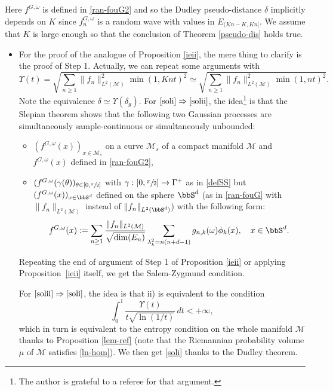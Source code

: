 Here $f^{G,\omega}$ is defined in \eqref{ran-fouG2} and so the Dudley pseudo-distance $\delta$ implicitly depends on $K$ since $f_n^{G,\omega}$ is a random wave with values in $E_{(Kn-K,Kn]}$.
We assume that $K$ is large enough so that the conclusion of Theorem \ref{pseudo-dis} holds true.

\begin{itemize}
\item
For the proof of the analogue of Proposition \ref{ieii}, the mere thing to clarify is the proof of Step 1. Actually, we can repeat some arguments with
\begin{equation*}
\Upsilon(t)=\sqrt{\sum_{n\geq 1} \|f_n\|_{L^2(\mathcal{M})}^2 \min(1,Knt)^2} \simeq \sqrt{\sum_{n\geq 1} \|f_n\|_{L^2(\mathcal{M})}^2 \min(1,nt)^2}.
\end{equation*}
Note the equivalence $\delta\simeq \Upsilon(\delta_g)$.
For $\eqref{soli}\Rightarrow\eqref{solii}$, the idea\footnote{The author is grateful to a referee for that argument.} is that the Slepian theorem shows that the following two Gaussian processes are simultaneously sample-continuous or simultaneously unbounded:
\begin{itemize}
\item $(f^{G,\omega}(x))_{x\in \mathcal{M}_s}$ on a curve $\mathcal{M}_s$ of a compact manifold $ \mathcal{M}$ and $f^{G,\omega}(x)$ defined in \eqref{ran-fouG2},
\item $(f^{G,\omega}(\gamma(\theta))_{\theta\in [0,\sfrac{\pi}{2}]}$ with $\gamma:[0,\sfrac{\pi}{2}]\to \Gamma^+$ as in \eqref{defSS} but $(f^{G,\omega}(x))_{x\in \bbS^d}$ defined on the sphere $\bbS^d$ (as in \eqref{ran-fouG} with $\|f_n\|_{L^2(\mathcal{M})}$ instead of $\|f_n\|_{L^2(\bbS^d)}$) with the following form:
\begin{equation*}
f^{G,\omega}(x):=\sum_{n\geq 1} \frac{\|f_n\|_{L^2(\mathcal{M})}}{\sqrt{\dim(E_n)}}\sum_{\lambda_k^2=n(n+d-1)} g_{n,k}(\omega) \phi_k(x),\quad x\in \bbS^d.
\end{equation*}
\end{itemize}
Repeating the end of argument of Step 1 of Proposition \ref{ieii} or applying Proposition~\ref{ieii} itself, we get the Salem-Zygmund condition.

For $\eqref{solii}\Rightarrow\eqref{soli}$, the idea is that ii) is equivalent to the condition
\[
\int_{0}^{1} \frac{\Upsilon(t)}{t\sqrt{\ln(1/t)}}\,dt<+\infty,
\]
which in turn is equivalent to the entropy condition on the whole manifold $\mathcal{M}$ thanks to Proposition \ref{lem-ref} (note that the Riemannian probability volume $\mu$ of $\mathcal{M}$ satisfies \eqref{ln-hom}). We then get \eqref{soli} thanks to the Dudley theorem.


\end{itemize}
